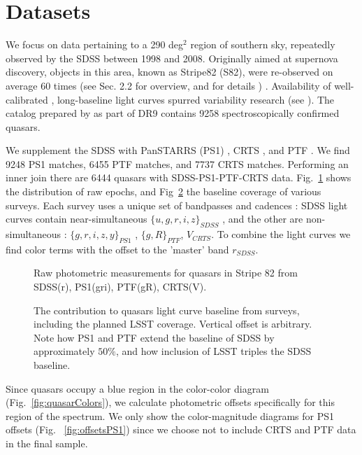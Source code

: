 \documentclass[twocolumn]{aastex62}
\begin{document}
\section{Datasets}

We focus on data pertaining to a 290 deg$^{2}$ region of southern sky, repeatedly observed by the SDSS between 1998 and 2008. Originally aimed at supernova discovery, objects in this area, known as Stripe82 (S82), were  re-observed on average 60 times (see \citealt{macleod2012} Sec. 2.2 for overview, and \citealt{annis2014} for details ) . Availability of well-calibrated \citep{ivezic2007}, long-baseline light curves spurred variability research (see \citealt{sesar2007}). The catalog prepared by \citep{schneider2008} as part of DR9  contains 9258 spectroscopically confirmed quasars.  

We supplement the SDSS with PanSTARRS (PS1) \citep{chambers2011,flewelling2018}, CRTS \citep{drake2009}, and PTF \citep{rau2009}. We find 9248 PS1 matches, 6455 PTF matches, and 7737 CRTS matches. Performing an inner join there are 6444 quasars with SDSS-PS1-PTF-CRTS data. Fig.~\ref{fig:rawBaselines}  shows the distribution of raw epochs, and Fig~\ref{fig:lcExtent} the  baseline coverage of various surveys.    Each survey uses a unique set of bandpasses and cadences : SDSS light curves contain near-simultaneous $\{u,g,r,i,z\}_{SDSS}$ , and the other are  non-simultaneous : $\{g,r,i,z,y\}_{PS1}$ ,  $\{g,R\}_{PTF}$, $V_{CRTS}$.  To combine the light curves we find color terms with the offset to the 'master' band  $r_{SDSS}$.

\begin{figure}%
\caption{Raw photometric measurements for quasars in Stripe 82 from SDSS(r),  PS1(gri),  PTF(gR), CRTS(V).}
\label{fig:rawBaselines}
\end{figure} 

\begin{figure}
\caption{The contribution to quasars light curve baseline from surveys, including the planned LSST coverage. Vertical offset is arbitrary. Note how PS1 and PTF extend the baseline of SDSS by approximately $50\%$, and how inclusion of LSST triples the SDSS baseline. }
\label{fig:lcExtent}
\end{figure} 

Since quasars occupy a blue region in the color-color diagram (Fig.~\ref{fig:quasarColors}), we calculate photometric offsets specifically for this region of the spectrum.  We only show the color-magnitude diagrams  for PS1 offsets  (Fig. ~\ref{fig:offsetsPS1}) since we choose not to include CRTS and PTF data in the final sample. 
\end{document}
